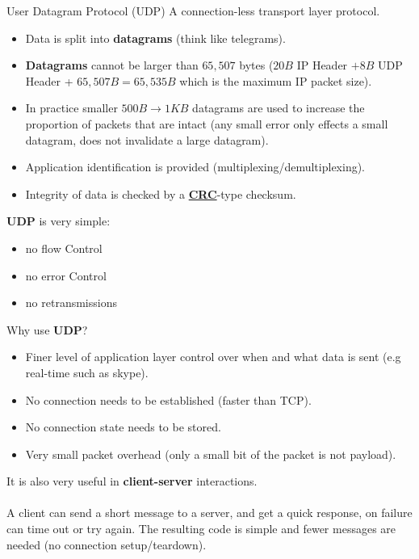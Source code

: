 \begin{definitionbox}{User Datagram Protocol (UDP)}
    A connection-less transport layer protocol.
    \begin{itemize}
        \setlength\itemsep{0em}
        \item Data is split into \textbf{datagrams} (think like telegrams).
        \item \textbf{Datagrams} cannot be larger than $65,507$ bytes ($20B$ IP Header $+ 8B$ UDP Header + $65,507B = 65,535B$ which is the maximum IP packet size).
        \item In practice smaller $500B \to 1KB$ datagrams are used to increase the proportion of packets that are intact (any small error only effects a small datagram, does not invalidate a large datagram).
        \item Application identification is provided (multiplexing/demultiplexing).
        \item Integrity of data is checked by a \href{https://en.wikipedia.org/wiki/Cyclic_redundancy_check}{\textbf{CRC}}-type checksum.
    \end{itemize}
    \textbf{UDP} is very simple:
    \begin{itemize}
        \setlength\itemsep{0em}
        \item no flow Control
        \item no error Control
        \item no retransmissions
    \end{itemize}
    Why use \textbf{UDP}?
    \begin{itemize}
        \setlength\itemsep{0em}
        \item Finer level of application layer control over when and what data is sent (e.g real-time such as skype).
        \item No connection needs to be established (faster than TCP).
        \item No connection state needs to be stored.
        \item Very small packet overhead (only a small bit of the packet is not payload).
    \end{itemize}
    It is also very useful in \textbf{client-server} interactions.
    \\
    \\ A client can send a short message to a server, and get a quick response, on failure can time out or try again. The resulting code is simple and fewer messages are needed (no connection setup/teardown).
\end{definitionbox}
